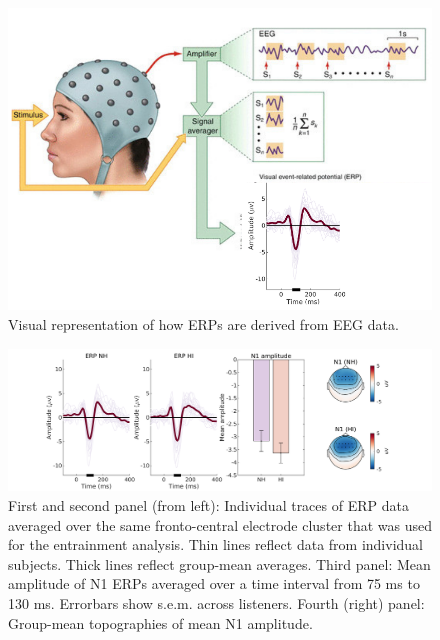 \documentclass{article}
\begin{document}
\begin{figure}[H]
  \centering
  \includegraphics[width=1\textwidth]{Untitled design.png} %
  \caption{Visual representation of how ERPs are derived from EEG data.} %
  \label{fig:averaging} %
\end{figure}

\begin{figure}[H]
  \centering
  \includegraphics[width=1\textwidth]{figure-erp.png} %
  \caption{First and second panel (from left): Individual traces of ERP data averaged over the same fronto-central electrode cluster that was used for the entrainment analysis. Thin lines reflect data from individual subjects. Thick lines reflect group-mean averages. Third panel: Mean amplitude of N1 ERPs averaged over a time interval from 75 ms to 130 ms. Errorbars show s.e.m. across listeners. Fourth (right) panel: Group-mean topographies of mean N1 amplitude.
} %
  \label{fig:erp} %
\end{figure}
\end{document}
